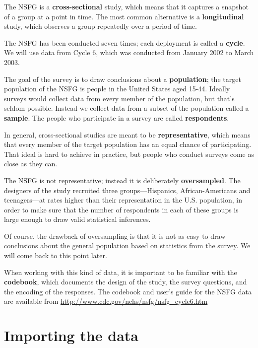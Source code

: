 \documentclass[12pt]{book}
\begin{document}
The NSFG is a {\bf cross-sectional} study, which means that it
captures a snapshot of a group at a point in time.  The most
common alternative is a {\bf longitudinal} study, which observes a
group repeatedly over a period of time.

The NSFG has been conducted seven times; each deployment is called a
{\bf cycle}.  We will use data from Cycle 6, which was conducted from
January 2002 to March 2003.  

The goal of the survey is to draw conclusions about a {\bf
  population}; the target population of the NSFG is people in the
United States aged 15-44.  Ideally surveys would collect data from
every member of the population, but that's seldom possible.  Instead
we collect data from a subset of the population called a {\bf sample}.
The people who participate in a survey are called {\bf respondents}.

In general,
cross-sectional studies are meant to be {\bf representative}, which
means that every member of the target population has an equal chance
of participating.  That ideal is hard to achieve in
practice, but people who conduct surveys come as close as they can.
 

The NSFG is not representative; instead it is deliberately {\bf
  oversampled}.  The designers of the study recruited three
groups---Hispanics, African-Americans and teenagers---at rates higher
than their representation in the U.S. population, in order to
make sure that the number of respondents in each of
these groups is large enough to draw valid statistical inferences.

Of course, the drawback of oversampling is that it is not as easy
to draw conclusions about the general population based on statistics
from the survey.  We will come back to this point later.

When working with this kind of data, it is important to be familiar
with the {\bf codebook}, which documents the design of the study, the
survey questions, and the encoding of the responses.  The codebook and
user's guide for the NSFG data are available from
\url{http://www.cdc.gov/nchs/nsfg/nsfg_cycle6.htm}


\section{Importing the data}
\end{document}
